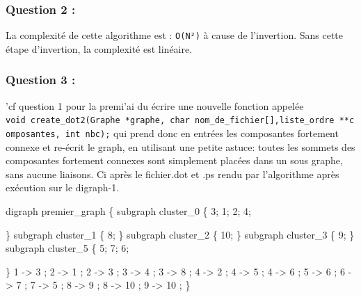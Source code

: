 \documentclass[]{article}
\newenvironment{Shaded}{}{}
\newcommand{\DecValTok}[1]{\textcolor[rgb]{0.25,0.63,0.44}{{#1}}}
\newcommand{\NormalTok}[1]{{#1}}
\begin{document}
\subsubsection{Question 2 :}\label{question-2-1}

La complexité de cette algorithme est : \texttt{O(N²)} à cause de
l'invertion. Sans cette étape d'invertion, la complexité est linéaire.

\subsubsection{Question 3 :}\label{question-3-1}

'cf question 1 pour la premi'ai du écrire une nouvelle fonction appelée
\texttt{void\ create\_dot2(Graphe\ *graphe,\ char\ nom\_de\_fichier{[}{]},liste\_ordre\ **composantes,\ int\ nbc);}
qui prend donc en entrées les composantes fortement connexe et re-écrit
le graph, en utilisant une petite astuce: toutes les sommets des
composantes fortement connexes sont simplement placées dans un sous
graphe, sans aucune liaisons. Ci après le fichier.dot et .ps rendu par
l'algorithme après exécution sur le digraph-1.

\begin{Shaded}
\begin{Highlighting}[]
\NormalTok{digraph premier_graph \{}
    \NormalTok{subgraph cluster_0 \{}
        \DecValTok{3}\NormalTok{;}
        \DecValTok{1}\NormalTok{;}
        \DecValTok{2}\NormalTok{;}
        \DecValTok{4}\NormalTok{;}
 
    \NormalTok{\}}
    \NormalTok{subgraph cluster_1 \{}
        \DecValTok{8}\NormalTok{;}
    \NormalTok{\}   subgraph cluster_2 \{}
        \DecValTok{10}\NormalTok{;}
    \NormalTok{\}   subgraph cluster_3 \{}
        \DecValTok{9}\NormalTok{;}
    \NormalTok{\}   subgraph cluster_5 \{}
        \DecValTok{5}\NormalTok{;}
        \DecValTok{7}\NormalTok{;}
        \DecValTok{6}\NormalTok{;}
 
    \NormalTok{\}}
\DecValTok{1} \NormalTok{-> }\DecValTok{3} \NormalTok{;}
\DecValTok{2} \NormalTok{-> }\DecValTok{1} \NormalTok{;}
\DecValTok{2} \NormalTok{-> }\DecValTok{3} \NormalTok{;}
\DecValTok{3} \NormalTok{-> }\DecValTok{4} \NormalTok{;}
\DecValTok{3} \NormalTok{-> }\DecValTok{8} \NormalTok{;}
\DecValTok{4} \NormalTok{-> }\DecValTok{2} \NormalTok{;}
\DecValTok{4} \NormalTok{-> }\DecValTok{5} \NormalTok{;}
\DecValTok{4} \NormalTok{-> }\DecValTok{6} \NormalTok{;}
\DecValTok{5} \NormalTok{-> }\DecValTok{6} \NormalTok{;}
\DecValTok{6} \NormalTok{-> }\DecValTok{7} \NormalTok{;}
\DecValTok{7} \NormalTok{-> }\DecValTok{5} \NormalTok{;}
\DecValTok{8} \NormalTok{-> }\DecValTok{9} \NormalTok{;}
\DecValTok{8} \NormalTok{-> }\DecValTok{10} \NormalTok{;}
\DecValTok{9} \NormalTok{-> }\DecValTok{10} \NormalTok{;}
\NormalTok{\}}
\end{Highlighting}
\end{Shaded}
\end{document}
